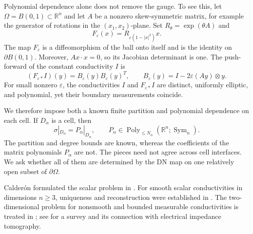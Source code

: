 \documentclass[10pt,a4paper]{amsart}
\newcommand{\R}{\mathbb R}
\newcommand{\Sym}{\operatorname{Sym}}
\newcommand{\eps}{\varepsilon}
\begin{document}
Polynomial dependence alone does not remove the gauge.  To see this, let
\(\Omega=B(0,1)\subset \R^n\) and let \(A\) be a nonzero skew-symmetric
matrix, for example the generator of rotations in the \((x_1,x_2)\)-plane.
Set \(R_\theta=\exp(\theta A)\) and
\begin{equation}
  F_\eps(x)=R_{\eps(1-|x|^2)}x.
  \label{eq:polynomial-gauge-example-map}
\end{equation}
The map \(F_\eps\) is a diffeomorphism of the ball onto itself and is the
identity on \(\partial B(0,1)\).  Moreover, \(Ax\cdot x=0\), so its Jacobian
determinant is one.  The push-forward of the constant conductivity \(I\) is
\begin{equation}
  (F_{\eps*}I)(y)
  =B_\eps(y)B_\eps(y)^T,\qquad
  B_\eps(y)=I-2\eps (Ay)\otimes y.
  \label{eq:polynomial-gauge-example-conductivity}
\end{equation}
For small nonzero \(\eps\), the conductivities \(I\) and \(F_{\eps*}I\) are
distinct, uniformly elliptic, and polynomial, yet their boundary measurements
coincide.


We therefore impose both a known finite partition and polynomial dependence on
each cell.  If \(D_\alpha\) is a cell, then
\begin{equation}
  \sigma|_{D_\alpha}=P_\alpha|_{D_\alpha},
  \qquad
  P_\alpha\in \operatorname{Poly}_{\le N_\alpha}
       (\R^n;\Sym_n).
  \label{eq:piecewise-polynomial}
\end{equation}
The partition and degree bounds are known, whereas the coefficients of the
matrix polynomials \(P_\alpha\) are not.  The pieces need not agree across cell
interfaces.  We ask whether all of them are determined by the DN map on one
relatively open subset of \(\partial\Omega\).

Calder\'on formulated the scalar problem in \cite{Calderon1980}.  For smooth
scalar conductivities in dimensions \(n\ge3\), uniqueness and reconstruction
were established in \cite{SylvesterUhlmann1987,Nachman1988}.  The
two-dimensional problem for nonsmooth and bounded measurable conductivities is
treated in \cite{BrownUhlmann1997,AstalaPaivarinta2006}; see
\cite{Uhlmann2009} for a survey and its connection with electrical impedance
tomography.
\end{document}
